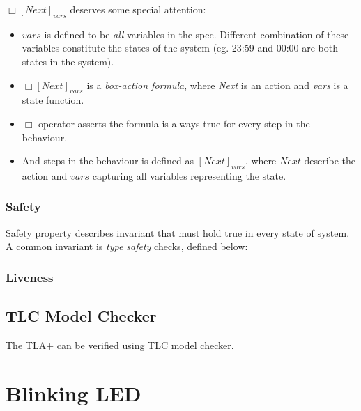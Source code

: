 \documentclass{report}
\begin{document}
$\Box[Next]_{vars}$ deserves some special attention:
\begin{itemize}
    \item $vars$ is defined to be \textit{all} variables in the spec. Different
    combination of these variables constitute the states of the system (eg.
    23:59 and 00:00 are both states in the system).
    \item $\Box[Next]_{vars}$ is a \textit{box-action formula}, where
    \textit{Next} is an action and \textit{vars} is a state function.
    \item $\Box$ operator asserts the formula is always true for every step in the behaviour.
    \item And steps in the behaviour is defined as $[Next]_{vars}$, where $Next$
    describe the action and $vars$ capturing all variables representing the state.
\end{itemize}


\subsection{Safety}

Safety property describes invariant that must hold true in every state of
system. A common invariant is \textit{type safety} checks, defined below:\newline

\subsection{Liveness}

\section{TLC Model Checker}

The TLA+ can be verified using TLC model checker.


\chapter{Blinking LED}
\end{document}
